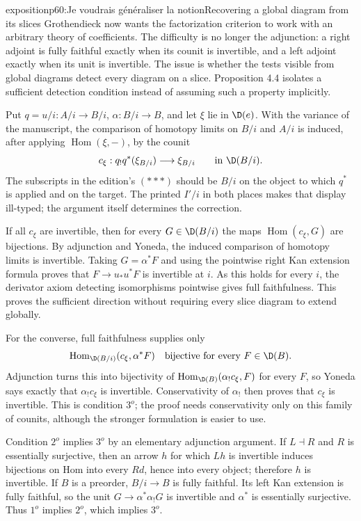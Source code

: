 \begin{dcomment}{exposition}{p60:Je voudrais généraliser la notion}{Recovering a global diagram from its slices}
Grothendieck now wants the factorization criterion to work with an arbitrary theory of coefficients. The difficulty is no longer the adjunction: a right adjoint is fully faithful exactly when its counit is invertible, and a left adjoint exactly when its unit is invertible. The issue is whether the tests visible from global diagrams detect every diagram on a slice. Proposition 4.4 isolates a sufficient detection condition instead of assuming such a property implicitly.

Put $q=u/i:A/i\to B/i$, $\alpha:B/i\to B$, and let $\xi$ lie in $\D(e)$. With the variance of the manuscript, the comparison of homotopy limits on $B/i$ and $A/i$ is induced, after applying $\operatorname{Hom}(\xi,-)$, by the counit
\[
 c_\xi:q_!q^*(\xi_{B/i})\longrightarrow\xi_{B/i}
 \qquad\hbox{in }\D(B/i).
\]
The subscripts in the edition's $(***)$ should be $B/i$ on the object to which $q^*$ is applied and on the target. The printed $I'/i$ in both places makes that display ill-typed; the argument itself determines the correction.

If all $c_\xi$ are invertible, then for every $G\in\D(B/i)$ the maps $\operatorname{Hom}(c_\xi,G)$ are bijections. By adjunction and Yoneda, the induced comparison of homotopy limits is invertible. Taking $G=\alpha^*F$ and using the pointwise right Kan extension formula proves that $F\to u_*u^*F$ is invertible at $i$. As this holds for every $i$, the derivator axiom detecting isomorphisms pointwise gives full faithfulness. This proves the sufficient direction without requiring every slice diagram to extend globally.

For the converse, full faithfulness supplies only
\[
 \operatorname{Hom}_{\D(B/i)}(c_\xi,\alpha^*F)
 \quad\hbox{bijective for every }F\in\D(B).
\]
Adjunction turns this into bijectivity of $\operatorname{Hom}_{\D(B)}(\alpha_!c_\xi,F)$ for every $F$, so Yoneda says exactly that $\alpha_!c_\xi$ is invertible. Conservativity of $\alpha_!$ then proves that $c_\xi$ is invertible. This is condition $3^o$; the proof needs conservativity only on this family of counits, although the stronger formulation is easier to use.

Condition $2^o$ implies $3^o$ by an elementary adjunction argument. If $L\dashv R$ and $R$ is essentially surjective, then an arrow $h$ for which $Lh$ is invertible induces bijections on Hom into every $Rd$, hence into every object; therefore $h$ is invertible. If $B$ is a preorder, $B/i\to B$ is fully faithful. Its left Kan extension is fully faithful, so the unit $G\to\alpha^*\alpha_!G$ is invertible and $\alpha^*$ is essentially surjective. Thus $1^o$ implies $2^o$, which implies $3^o$.


\end{dcomment}

